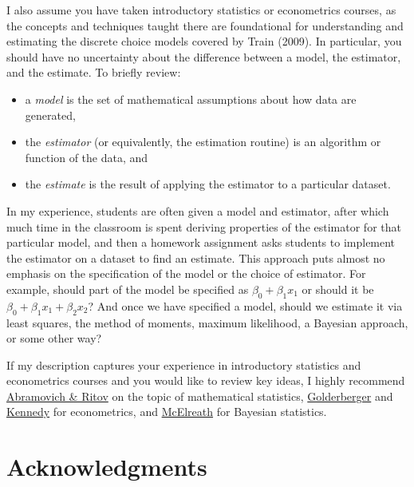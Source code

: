 \documentclass[
  letterpaper,
  DIV=11,
  numbers=noendperiod]{scrreprt}
\providecommand{\tightlist}{%
  \setlength{\itemsep}{0pt}\setlength{\parskip}{0pt}}\usepackage{longtable,booktabs,array}
\begin{document}
I also assume you have taken introductory statistics or econometrics
courses, as the concepts and techniques taught there are foundational
for understanding and estimating the discrete choice models covered by
Train (2009). In particular, you should have no uncertainty about the
difference between a model, the estimator, and the estimate. To briefly
review:

\begin{itemize}
\tightlist
\item
  a \emph{model} is the set of mathematical assumptions about how data
  are generated,
\item
  the \emph{estimator} (or equivalently, the estimation routine) is an
  algorithm or function of the data, and
\item
  the \emph{estimate} is the result of applying the estimator to a
  particular dataset.
\end{itemize}

In my experience, students are often given a model and estimator, after
which much time in the classroom is spent deriving properties of the
estimator for that particular model, and then a homework assignment asks
students to implement the estimator on a dataset to find an estimate.
This approach puts almost no emphasis on the specification of the model
or the choice of estimator. For example, should part of the model be
specified as \(\beta_0 + \beta_1x_1\) or should it be
\(\beta_0 + \beta_1x_1 + \beta_2x_2\)? And once we have specified a
model, should we estimate it via least squares, the method of moments,
maximum likelihood, a Bayesian approach, or some other way?

If my description captures your experience in introductory statistics
and econometrics courses and you would like to review key ideas, I
highly recommend
\href{https://www.routledge.com/Statistical-Theory-A-Concise-Introduction/Abramovich-Ritov/p/book/9781032007458}{Abramovich
\& Ritov} on the topic of mathematical statistics,
\href{https://www.amazon.com/Course-Econometrics-Arthur-S-Goldberger/dp/0674175441}{Golderberger}
and
\href{https://www.amazon.com/Guide-Econometrics-6th-Peter-Kennedy/dp/1405182571/}{Kennedy}
for econometrics, and
\href{https://xcelab.net/rm/statistical-rethinking/}{McElreath} for
Bayesian statistics.

\section*{Acknowledgments}\label{acknowledgments}
\end{document}
